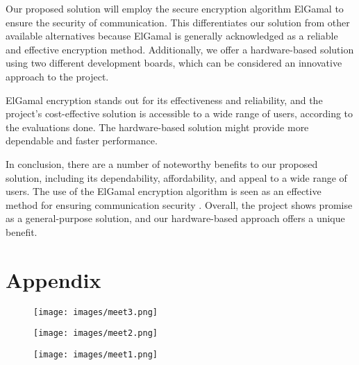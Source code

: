 \documentclass[12pt]{article}
\begin{document}
	
	Our proposed solution will employ the secure encryption algorithm ElGamal to ensure the security of communication. This differentiates our solution from other available alternatives because ElGamal is generally acknowledged as a reliable and effective encryption method\cite{mollin2001introduction}. Additionally, we offer a hardware-based solution using two different development boards, which can be considered an innovative approach to the project.
	
	ElGamal encryption stands out for its effectiveness and reliability, and the project's cost-effective solution is accessible to a wide range of users, according to the evaluations done. The hardware-based solution might provide more dependable and faster performance.
	
In conclusion, there are a number of noteworthy benefits to our proposed solution, including its dependability, affordability, and appeal to a wide range of users. The use of the ElGamal encryption algorithm is seen as an effective method for ensuring communication security	\cite{van1999fundamentals}. Overall, the project shows promise as a general-purpose solution, and our hardware-based approach offers a unique benefit.
	\newpage



	\newpage
	\section{Appendix}
	\begin{figure}[H]
	\centering
	\label{Meeting1}
	\texttt{[image: images/meet3.png]}\\[0.5 cm]			
\end{figure}
	\begin{figure}[H]
	\centering
	\label{Meeting2}
	\texttt{[image: images/meet2.png]}\\[0.5 cm]			
\end{figure}
	\begin{figure}[H]
	\centering
	\label{Meeting3}
	\texttt{[image: images/meet1.png]}\\[0.5 cm]			
\end{figure}
	
	
\end{document}
